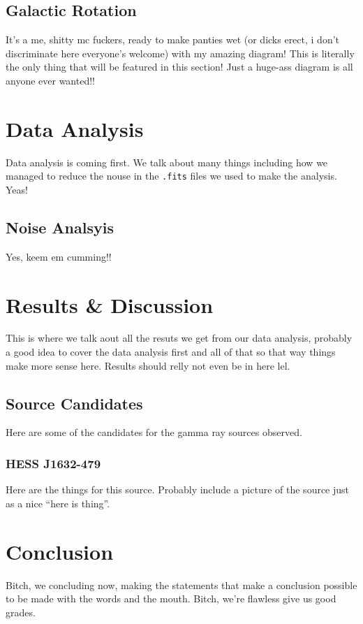 \documentclass[a4paper,titlepage,oneside]{article}
\begin{document}
\begin{multicols}{2}
\subsection{Galactic Rotation}
It's a me, shitty mc fuckers, ready to make panties wet (or dicks erect, i don't discriminate here everyone's welcome) with my amazing diagram! This is literally the only thing that will be featured in this section! Just a huge-ass diagram is all anyone ever wanted!!

\section{Data Analysis}
Data analysis is coming first. We talk about many things including how we managed to reduce the nouse in the \texttt{.fits} files we used to make the analysis. Yeas!

\subsection{Noise Analsyis}
Yes, keem em cumming!!

\section{Results \& Discussion}
This is where we talk aout all the resuts we get from our data analysis, probably a good idea to cover the data analysis first and all of that so that way things make more sense here. Results should relly not even be in here lel.

\subsection{Source Candidates}
Here are some of the candidates for the gamma ray sources observed.

\subsubsection{HESS J1632-479}
Here are the things for this source. Probably include a picture of the source just as a nice ``here is thing''.

\section{Conclusion}
Bitch, we concluding now, making the statements that make a conclusion possible to be made with the words and the mouth. Bitch, we're flawless give us good grades.
\end{multicols}



\end{document}
